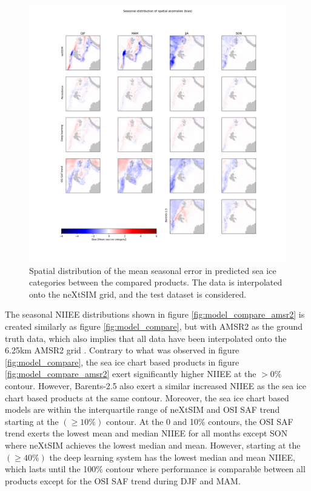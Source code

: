 \documentclass[../main/thesis.tex]{subfiles}
\begin{document}
\begin{figure}
    \centering
    \includegraphics[width=\textwidth]{anomalies}
    \caption{\label{fig:anomalies}Spatial distribution of the mean seasonal error in predicted sea ice categories between the compared products. The data is interpolated onto the neXtSIM grid, and the test dataset is considered.}
\end{figure}


The seasonal NIIEE distributions shown in figure \ref{fig:model_compare_amsr2} is created similarly as figure \ref{fig:model_compare}, but with AMSR2 as the ground truth data, which also implies that all data have been interpolated onto the 6.25km AMSR2 grid \citep{Spreen2008}. Contrary to what was observed in figure \ref{fig:model_compare}, the sea ice chart based products in figure \ref{fig:model_compare_amsr2} exert significantly higher NIIEE at the $>0\%$ contour. However, Barents-2.5 also exert a similar increased NIIEE as the sea ice chart based products at the same contour. Moreover, the sea ice chart based models are within the interquartile range of neXtSIM and OSI SAF trend starting at the $(\geq10\%)$ contour. At the 0 and 10\% contours, the OSI SAF trend exerts the lowest mean and median NIIEE for all months except SON where neXtSIM achieves the lowest median and mean. However, starting at the $(\geq40\%)$ the deep learning system has the lowest median and mean NIIEE, which lasts until the 100\% contour where performance is comparable between all products except for the OSI SAF trend during DJF and MAM.
\end{document}
